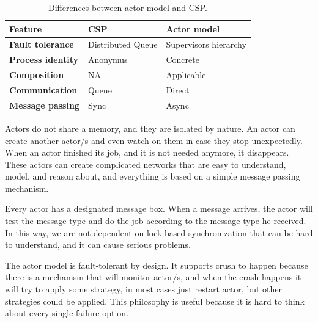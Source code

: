 \begin{table}[h!]
	\begin{center}
		\begin{tabular}{l|l|l}
			\textbf{Feature} & \textbf{CSP} & \textbf{Actor model}\\
			\hline
			\textbf{Fault tolerance} & Distributed Queue &  Supervisors hierarchy \\
			\textbf{Process identity} & Anonymus & Concrete \\
			\textbf{Composition} & NA & Applicable \\
			\textbf{Communication} & Queue & Direct \\
			\textbf{Message passing} & Sync & Async\\
		\end{tabular}
	\end{center}
	\vspace{-0.5cm}
	\caption{Differences between actor model and CSP.}
	\label{tab:table6}
\end{table}

\noindent
Actors do not share a memory, and they are isolated by nature. An actor can create another actor/s and even watch on them in case they stop unexpectedly. When an actor finished its job, and it is not needed anymore, it disappears. These actors can create complicated networks that are easy to understand, model, and reason about, and everything is based on a simple message passing mechanism. 

Every actor has a designated message box. When a message arrives, the actor will test the message type and do the job according to the message type he received. In this way, we are not dependent on lock-based synchronization that can be hard to understand, and it can cause serious problems.

The actor model is fault-tolerant by design. It supports crush to happen because there is a  mechanism that will monitor actor/s, and when the crash happens it will try to apply some strategy, in most cases just restart actor, but other strategies could be applied. This philosophy is useful because it is hard to think about every single failure option.
%
%